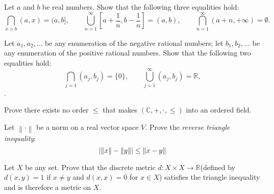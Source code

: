 \documentclass[12pt,letterpaper,boxed]{hmcpset}
\DeclarePairedDelimiter\abs{\lvert}{\rvert}
\begin{document}

\begin{problem}[Exercise 5.4.]
Let $a$ and $b$ be real numbers. Show that the following three equalities hold: $$\bigcap_{x > b}(a,x) = (a,b], \quad \quad \bigcup_{n=1}^{\infty}[a + \frac{1}{n}, b - \frac{1}{n}]=(a,b), \quad \quad \bigcap_{n = 1}^{\infty}(a + n,+\infty) = \emptyset.$$
\end{problem}


\begin{solution}

\end{solution}

\begin{problem}[Exercise 5.5.]
Let $a_1, a_2, \dots$ be any enumeration of the negative rational numbers; let $b_1, b_2, \dots$ be any enumeration of the positive rational numbers. Show that the following two equalities hold: $$ \bigcap_{j = 1}(a_j,b_j) = \{0\}, \quad \quad \bigcup_{j=1}^{\infty}(a_j,b_j)=\mathbb{R},$$.
\end{problem}

\begin{solution}

\end{solution}



\begin{problem}[Exercise 6.4.]
Prove there exists no order $\leq$ that makes $(\mathbb{C},+,\cdot,\leq)$ into an ordered field.
\end{problem}

\begin{solution}

\end{solution}


\begin{problem}[Exercise 1.7.]
Let $\left\lVert \cdot \right\rVert$ be a norm on a real vector space $V$. Prove the \textit{reverse triangle inequality}: $$\abs{\left\lVert x \right\rVert - \left\lVert y \right\rVert} \leq \left\lVert x - y \right\rVert$$
\end{problem}

\begin{solution}

\end{solution}

\begin{problem}[Exercise 2.3.]
Let $X$ be any set. Prove that the discrete metric $d : X \times X \rightarrow \mathbb{R}$(defined by $d(x,y)=1$ if $x \neq y$ and $d(x, x) = 0$ for $x \in X$) satisfies the triangle inequality and is therefore a metric on $X$.
\end{problem}
\end{document}
